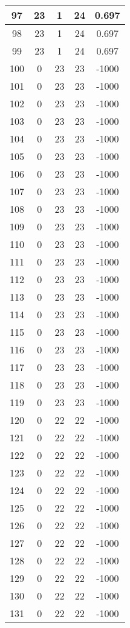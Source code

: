 \documentclass[letterpaper, 12pt]{article}
\begin{document}
\begin{longtable}{|c|c|c|c|c|}
\hline
97 & 23 & 1 & 24 & 0.697 \\
\hline
98 & 23 & 1 & 24 & 0.697 \\
\hline
99 & 23 & 1 & 24 & 0.697 \\
\hline
100 & 0 & 23 & 23 & -1000 \\
\hline
101 & 0 & 23 & 23 & -1000 \\
\hline
102 & 0 & 23 & 23 & -1000 \\
\hline
103 & 0 & 23 & 23 & -1000 \\
\hline
104 & 0 & 23 & 23 & -1000 \\
\hline
105 & 0 & 23 & 23 & -1000 \\
\hline
106 & 0 & 23 & 23 & -1000 \\
\hline
107 & 0 & 23 & 23 & -1000 \\
\hline
108 & 0 & 23 & 23 & -1000 \\
\hline
109 & 0 & 23 & 23 & -1000 \\
\hline
110 & 0 & 23 & 23 & -1000 \\
\hline
111 & 0 & 23 & 23 & -1000 \\
\hline
112 & 0 & 23 & 23 & -1000 \\
\hline
113 & 0 & 23 & 23 & -1000 \\
\hline
114 & 0 & 23 & 23 & -1000 \\
\hline
115 & 0 & 23 & 23 & -1000 \\
\hline
116 & 0 & 23 & 23 & -1000 \\
\hline
117 & 0 & 23 & 23 & -1000 \\
\hline
118 & 0 & 23 & 23 & -1000 \\
\hline
119 & 0 & 23 & 23 & -1000 \\
\hline
120 & 0 & 22 & 22 & -1000 \\
\hline
121 & 0 & 22 & 22 & -1000 \\
\hline
122 & 0 & 22 & 22 & -1000 \\
\hline
123 & 0 & 22 & 22 & -1000 \\
\hline
124 & 0 & 22 & 22 & -1000 \\
\hline
125 & 0 & 22 & 22 & -1000 \\
\hline
126 & 0 & 22 & 22 & -1000 \\
\hline
127 & 0 & 22 & 22 & -1000 \\
\hline
128 & 0 & 22 & 22 & -1000 \\
\hline
129 & 0 & 22 & 22 & -1000 \\
\hline
130 & 0 & 22 & 22 & -1000 \\
\hline
131 & 0 & 22 & 22 & -1000 \\

\end{longtable}
\end{document}
